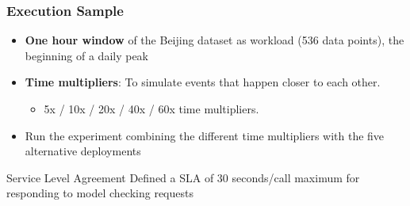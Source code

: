 \documentclass[pdf,10pt]{beamer}
\begin{document}
\begin{frame}\frametitle{Execution Sample}


\begin{itemize}
\item \textbf{One hour window} of the Beijing dataset as workload (536 data points), the beginning of a daily peak 
\item \textbf{Time multipliers}: To simulate events that happen closer to each other.
    \begin{itemize}
    \item  5x / 10x / 20x / 40x / 60x time multipliers.
\end{itemize}

\item Run the experiment combining the different time multipliers with the five alternative deployments
\end{itemize}

\begin{exampleblock}{Service Level Agreement }
Defined a SLA of 30 seconds/call maximum for responding to model checking requests
\end{exampleblock}
\end{frame}
\end{document}
